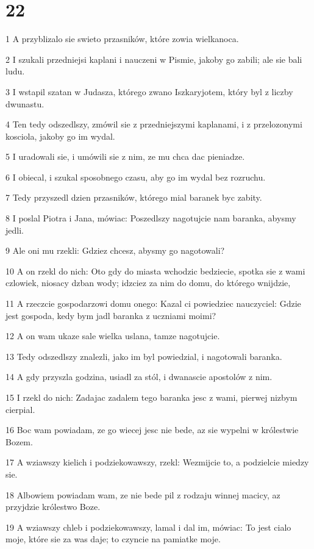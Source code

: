 \chapter{22}

\par 1 A przyblizalo sie swieto przasników, które zowia wielkanoca.
\par 2 I szukali przedniejsi kaplani i nauczeni w Pismie, jakoby go zabili; ale sie bali ludu.
\par 3 I wstapil szatan w Judasza, którego zwano Iszkaryjotem, który byl z liczby dwunastu.
\par 4 Ten tedy odszedlszy, zmówil sie z przedniejszymi kaplanami, i z przelozonymi kosciola, jakoby go im wydal.
\par 5 I uradowali sie, i umówili sie z nim, ze mu chca dac pieniadze.
\par 6 I obiecal, i szukal sposobnego czasu, aby go im wydal bez rozruchu.
\par 7 Tedy przyszedl dzien przasników, którego mial baranek byc zabity.
\par 8 I poslal Piotra i Jana, mówiac: Poszedlszy nagotujcie nam baranka, abysmy jedli.
\par 9 Ale oni mu rzekli: Gdziez chcesz, abysmy go nagotowali?
\par 10 A on rzekl do nich: Oto gdy do miasta wchodzic bedziecie, spotka sie z wami czlowiek, niosacy dzban wody; idzciez za nim do domu, do którego wnijdzie,
\par 11 A rzeczcie gospodarzowi domu onego: Kazal ci powiedziec nauczyciel: Gdzie jest gospoda, kedy bym jadl baranka z uczniami moimi?
\par 12 A on wam ukaze sale wielka uslana, tamze nagotujcie.
\par 13 Tedy odszedlszy znalezli, jako im byl powiedzial, i nagotowali baranka.
\par 14 A gdy przyszla godzina, usiadl za stól, i dwanascie apostolów z nim.
\par 15 I rzekl do nich: Zadajac zadalem tego baranka jesc z wami, pierwej nizbym cierpial.
\par 16 Boc wam powiadam, ze go wiecej jesc nie bede, az sie wypelni w królestwie Bozem.
\par 17 A wziawszy kielich i podziekowawszy, rzekl: Wezmijcie to, a podzielcie miedzy sie.
\par 18 Albowiem powiadam wam, ze nie bede pil z rodzaju winnej macicy, az przyjdzie królestwo Boze.
\par 19 A wziawszy chleb i podziekowawszy, lamal i dal im, mówiac: To jest cialo moje, które sie za was daje; to czyncie na pamiatke moje.
